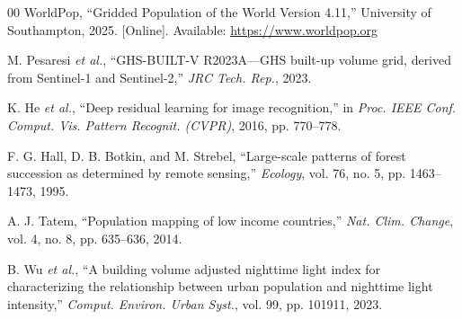 \documentclass[conference]{IEEEtran}
\begin{document}
\begin{thebibliography}{00}
 WorldPop, ``Gridded Population of the World Version 4.11,'' University of Southampton, 2025. [Online]. Available: \url{https://www.worldpop.org}

 M. Pesaresi \textit{et al.}, ``GHS-BUILT-V R2023A---GHS built-up volume grid, derived from Sentinel-1 and Sentinel-2,'' \textit{JRC Tech. Rep.}, 2023.

 K. He \textit{et al.}, ``Deep residual learning for image recognition,'' in \textit{Proc. IEEE Conf. Comput. Vis. Pattern Recognit. (CVPR)}, 2016, pp. 770--778.

 F. G. Hall, D. B. Botkin, and M. Strebel, ``Large-scale patterns of forest succession as determined by remote sensing,'' \textit{Ecology}, vol. 76, no. 5, pp. 1463--1473, 1995.

 A. J. Tatem, ``Population mapping of low income countries,'' \textit{Nat. Clim. Change}, vol. 4, no. 8, pp. 635--636, 2014.

 B. Wu \textit{et al.}, ``A building volume adjusted nighttime light index for characterizing the relationship between urban population and nighttime light intensity,'' \textit{Comput. Environ. Urban Syst.}, vol. 99, pp. 101911, 2023.

\end{thebibliography}
\end{document}

